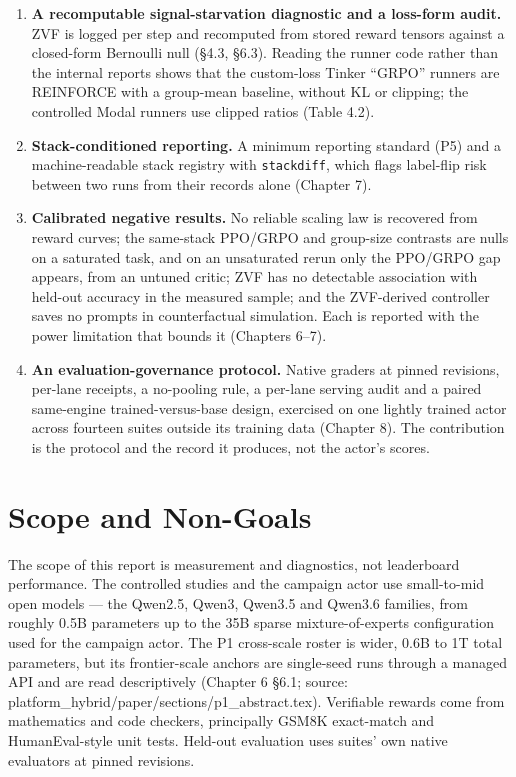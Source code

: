 \documentclass[12pt,a4paper]{report}
\providecommand{\tightlist}{%
  \setlength{\itemsep}{0pt}\setlength{\parskip}{0pt}}
\begin{document}
\begin{enumerate}
\def\labelenumi{\arabic{enumi}.}
\tightlist
\item
  \textbf{A recomputable signal-starvation diagnostic and a loss-form
  audit.} ZVF is logged per step and recomputed from stored reward
  tensors against a closed-form Bernoulli null (§4.3, §6.3). Reading the
  runner code rather than the internal reports shows that the
  custom-loss Tinker ``GRPO'' runners are REINFORCE with a group-mean
  baseline, without KL or clipping; the controlled Modal runners use
  clipped ratios (Table 4.2).
\item
  \textbf{Stack-conditioned reporting.} A minimum reporting standard
  (P5) and a machine-readable stack registry with \texttt{stackdiff},
  which flags label-flip risk between two runs from their records alone
  (Chapter 7).
\item
  \textbf{Calibrated negative results.} No reliable scaling law is
  recovered from reward curves; the same-stack PPO/GRPO and group-size
  contrasts are nulls on a saturated task, and on an unsaturated rerun
  only the PPO/GRPO gap appears, from an untuned critic; ZVF has no
  detectable association with held-out accuracy in the measured sample;
  and the ZVF-derived controller saves no prompts in counterfactual
  simulation. Each is reported with the power limitation that bounds it
  (Chapters 6--7).
\item
  \textbf{An evaluation-governance protocol.} Native graders at pinned
  revisions, per-lane receipts, a no-pooling rule, a per-lane serving
  audit and a paired same-engine trained-versus-base design, exercised
  on one lightly trained actor across fourteen suites outside its
  training data (Chapter 8). The contribution is the protocol and the
  record it produces, not the actor's scores.
\end{enumerate}

\section{Scope and Non-Goals}\label{scope-and-non-goals}

The scope of this report is measurement and diagnostics, not leaderboard
performance. The controlled studies and the campaign actor use
small-to-mid open models --- the Qwen2.5, Qwen3, Qwen3.5 and Qwen3.6
families, from roughly 0.5B parameters up to the 35B sparse
mixture-of-experts configuration used for the campaign actor. The P1
cross-scale roster is wider, 0.6B to 1T total parameters, but its
frontier-scale anchors are single-seed runs through a managed API and
are read descriptively (Chapter 6 §6.1; source:
platform\_hybrid/paper/sections/p1\_abstract.tex). Verifiable rewards
come from mathematics and code checkers, principally GSM8K exact-match
and HumanEval-style unit tests. Held-out evaluation uses suites' own
native evaluators at pinned revisions.
\end{document}
